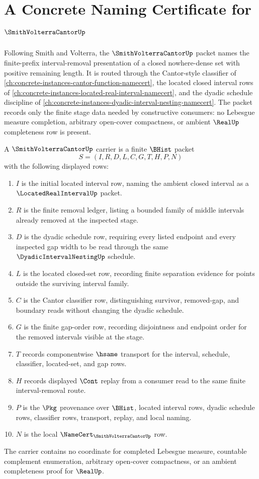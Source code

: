 \chapter{A Concrete Naming Certificate for $\SmithVolterraCantorUp$}
\label{ch:concrete-instances-smith-volterra-cantor-namecert}

Following Smith and Volterra, the $\SmithVolterraCantorUp$ packet names the finite-prefix interval-removal presentation of a closed nowhere-dense set with positive remaining length. It is routed through the Cantor-style classifier of \autoref{ch:concrete-instances-cantor-function-namecert}, the located closed interval rows of \autoref{ch:concrete-instances-located-real-interval-namecert}, and the dyadic schedule discipline of \autoref{ch:concrete-instances-dyadic-interval-nesting-namecert}. The packet records only the finite stage data needed by constructive consumers: no Lebesgue measure completion, arbitrary open-cover compactness, or ambient $\RealUp$ completeness row is present.

\begin{definition}
\label{def:smith-volterra-cantor-carrier}
A $\SmithVolterraCantorUp$ carrier is a finite $\BHist$ packet
$$
S=(I,R,D,L,C,G,T,H,P,N)
$$
with the following displayed rows:
\begin{enumerate}
\item $I$ is the initial located interval row, naming the ambient closed interval as a $\LocatedRealIntervalUp$ packet.
\item $R$ is the finite removal ledger, listing a bounded family of middle intervals already removed at the inspected stage.
\item $D$ is the dyadic schedule row, requiring every listed endpoint and every inspected gap width to be read through the same $\DyadicIntervalNestingUp$ schedule.
\item $L$ is the located closed-set row, recording finite separation evidence for points outside the surviving interval family.
\item $C$ is the Cantor classifier row, distinguishing survivor, removed-gap, and boundary reads without changing the dyadic schedule.
\item $G$ is the finite gap-order row, recording disjointness and endpoint order for the removed intervals visible at the stage.
\item $T$ records componentwise $\hsame$ transport for the interval, schedule, classifier, located-set, and gap rows.
\item $H$ records displayed $\Cont$ replay from a consumer read to the same finite interval-removal route.
\item $P$ is the $\Pkg$ provenance over $\BHist$, located interval rows, dyadic schedule rows, classifier rows, transport, replay, and local naming.
\item $N$ is the local $\NameCert_{\SmithVolterraCantorUp}$ row.
\end{enumerate}
The carrier contains no coordinate for completed Lebesgue measure, countable complement enumeration, arbitrary open-cover compactness, or an ambient completeness proof for $\RealUp$.
\end{definition}

